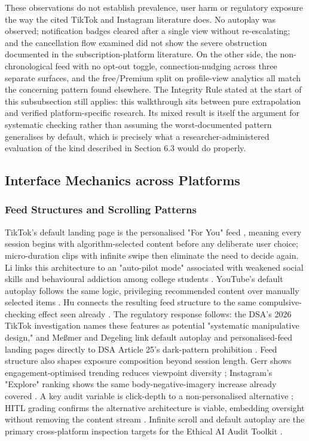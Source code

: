 \documentclass[11pt]{article}
\begin{document}
These observations do not establish prevalence, user harm or regulatory exposure the way the cited TikTok and Instagram literature does. No autoplay was observed; notification badges cleared after a single view without re-escalating; and the cancellation flow examined did not show the severe obstruction documented in the subscription-platform literature. On the other side, the non-chronological feed with no opt-out toggle, connection-nudging across three separate surfaces, and the free/Premium split on profile-view analytics all match the concerning pattern found elsewhere. The Integrity Rule stated at the start of this subsubsection still applies: this walkthrough sits between pure extrapolation and verified platform-specific research. Its mixed result is itself the argument for systematic checking rather than assuming the worst-documented pattern generalises by default, which is precisely what a researcher-administered evaluation of the kind described in Section 6.3 would do properly.

\subsection{Interface Mechanics across Platforms}

\subsubsection{Feed Structures and Scrolling Patterns}
\label{sec:feed_structures_scrolling_patterns} TikTok's default landing page is the personalised "For You" feed \parencites[42]{3195574}, meaning every session begins with algorithm-selected content before any deliberate user choice; micro-duration clips with infinite swipe then eliminate the need to decide again. Li links this architecture to an "auto-pilot mode" associated with weakened social skills and behavioural addiction among college students \parencites[2]{8958037}[6]{8958037}. YouTube's default autoplay follows the same logic, privileging recommended content over manually selected items \parencites[42]{3195574}. Hu connects the resulting feed structure to the same compulsive-checking effect seen already \parencites[2]{3303310}[20]{3303310}. The regulatory response follows: the DSA's 2026 TikTok investigation names these features as potential "systematic manipulative design," and Me{\ss}mer and Degeling link default autoplay and personalised-feed landing pages directly to DSA Article 25's dark-pattern prohibition \parencites[6]{8958037}[42]{3195574}. Feed structure also shapes exposure composition beyond session length. Gerr shows engagement-optimised trending reduces viewpoint diversity \parencites[3]{5142478}[29]{5142478}; Instagram's "Explore" ranking shows the same body-negative-imagery increase already covered \parencites[3]{3303310}. A key audit variable is click-depth to a non-personalised alternative \parencites[42]{3195574}; HITL grading confirms the alternative architecture is viable, embedding oversight without removing the content stream \parencites[17]{6805789}. Infinite scroll and default autoplay are the primary cross-platform inspection targets for the Ethical AI Audit Toolkit \parencites[6]{6295677}[2]{8958037}[2]{3303310}[42]{3195574}.
\end{document}

